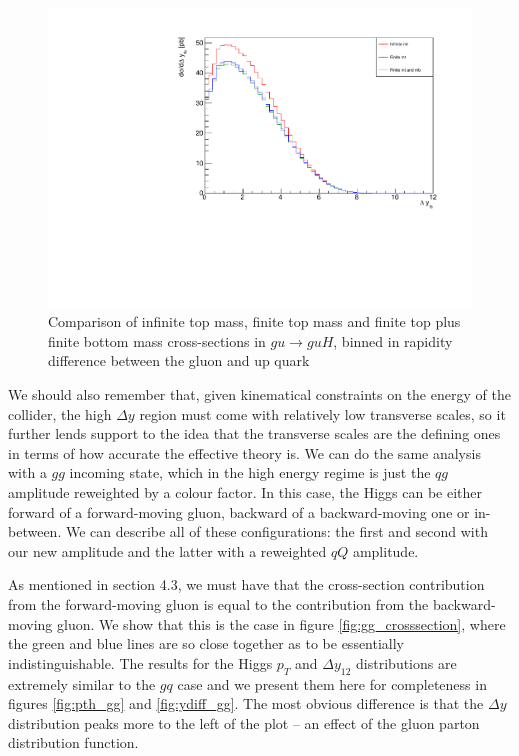 \begin{figure}[t]
\centering
\includegraphics[scale=0.75]{Images/ydiff_gu.pdf}
\caption{Comparison of infinite top mass, finite top mass and finite top plus finite bottom mass cross-sections in $gu \to guH$, binned in rapidity difference between the gluon and up quark}
\label{fig:higgs_ydiff}
\end{figure}

We should also remember that, given kinematical constraints on the energy of the collider, the high $\Delta y$ region must come with relatively low transverse scales, so it further lends support to the idea that the transverse scales are the defining ones in terms of how accurate the effective theory is. We can do the same analysis with a $gg$ incoming state, which in the high energy regime is just the $qg$ amplitude reweighted by a colour factor. In this case, the Higgs can be either forward of a forward-moving gluon, backward of a backward-moving one or in-between. We can describe all of these configurations: the first and second with our new amplitude and the latter with a reweighted $qQ$ amplitude. 

As mentioned in section 4.3, we must have that the cross-section contribution from the forward-moving gluon is equal to the contribution from the backward-moving gluon. We show that this is the case in figure \ref{fig:gg_crosssection}, where the green and blue lines are so close together as to be essentially indistinguishable. The results for the Higgs $p_T$ and $\Delta y_{12}$ distributions are extremely similar to the $gq$ case and we present them here for completeness in figures \ref{fig:pth_gg} and \ref{fig:ydiff_gg}. The most obvious difference is that the $\Delta y$ distribution peaks more to the left of the plot -- an effect of the gluon parton distribution function. 

